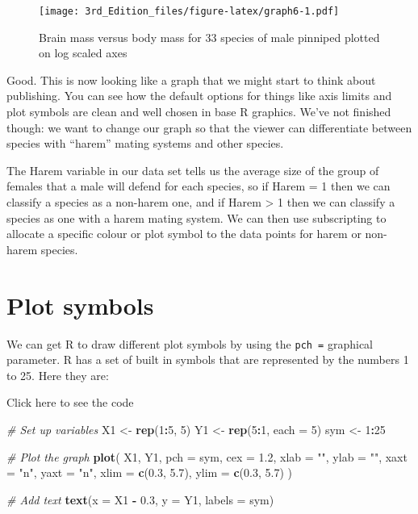 \documentclass[
]{book}
\newenvironment{Shaded}{\begin{snugshade}}{\end{snugshade}}
\newcommand{\CommentTok}[1]{\textcolor[rgb]{0.56,0.35,0.01}{\textit{#1}}}
\newcommand{\DataTypeTok}[1]{\textcolor[rgb]{0.13,0.29,0.53}{#1}}
\newcommand{\DecValTok}[1]{\textcolor[rgb]{0.00,0.00,0.81}{#1}}
\newcommand{\FloatTok}[1]{\textcolor[rgb]{0.00,0.00,0.81}{#1}}
\newcommand{\KeywordTok}[1]{\textcolor[rgb]{0.13,0.29,0.53}{\textbf{#1}}}
\newcommand{\NormalTok}[1]{#1}
\newcommand{\OperatorTok}[1]{\textcolor[rgb]{0.81,0.36,0.00}{\textbf{#1}}}
\newcommand{\StringTok}[1]{\textcolor[rgb]{0.31,0.60,0.02}{#1}}
\begin{document}
\begin{figure}
\centering
\texttt{[image: 3rd\_Edition\_files/figure-latex/graph6-1.pdf]}
\caption{\label{fig:graph6}Brain mass versus body mass for 33 species of male pinniped plotted on log scaled axes}
\end{figure}

Good. This is now looking like a graph that we might start to think about publishing. You can see how the default options for things like axis limits and plot symbols are clean and well chosen in base R graphics. We've not finished though: we want to change our graph so that the viewer can differentiate between species with ``harem'' mating systems and other species.

The Harem variable in our data set tells us the average size of the group of females that a male will defend for each species, so if Harem = 1 then we can classify a species as a non-harem one, and if Harem \textgreater{} 1 then we can classify a species as one with a harem mating system. We can then use subscripting to allocate a specific colour or plot symbol to the data points for harem or non-harem species.

\hypertarget{plot-symbols}{%
\section{Plot symbols}\label{plot-symbols}}

We can get R to draw different plot symbols by using the \texttt{pch\ =} graphical parameter. R has a set of built in symbols that are represented by the numbers 1 to 25. Here they are:

Click here to see the code

\begin{Shaded}
\begin{Highlighting}[]
\CommentTok{# Set up variables}
\NormalTok{X1 <-}\StringTok{ }\KeywordTok{rep}\NormalTok{(}\DecValTok{1}\OperatorTok{:}\DecValTok{5}\NormalTok{, }\DecValTok{5}\NormalTok{)}
\NormalTok{Y1 <-}\StringTok{ }\KeywordTok{rep}\NormalTok{(}\DecValTok{5}\OperatorTok{:}\DecValTok{1}\NormalTok{, }\DataTypeTok{each =} \DecValTok{5}\NormalTok{)}
\NormalTok{sym <-}\StringTok{ }\DecValTok{1}\OperatorTok{:}\DecValTok{25}

\CommentTok{# Plot the graph}
\KeywordTok{plot}\NormalTok{(}
\NormalTok{  X1,}
\NormalTok{  Y1,}
  \DataTypeTok{pch =}\NormalTok{ sym,}
  \DataTypeTok{cex =} \FloatTok{1.2}\NormalTok{,}
  \DataTypeTok{xlab =} \StringTok{""}\NormalTok{,}
  \DataTypeTok{ylab =} \StringTok{""}\NormalTok{,}
  \DataTypeTok{xaxt =} \StringTok{"n"}\NormalTok{,}
  \DataTypeTok{yaxt =} \StringTok{"n"}\NormalTok{,}
  \DataTypeTok{xlim =} \KeywordTok{c}\NormalTok{(}\FloatTok{0.3}\NormalTok{, }\FloatTok{5.7}\NormalTok{),}
  \DataTypeTok{ylim =} \KeywordTok{c}\NormalTok{(}\FloatTok{0.3}\NormalTok{, }\FloatTok{5.7}\NormalTok{)}
\NormalTok{)}

\CommentTok{# Add text}
\KeywordTok{text}\NormalTok{(}\DataTypeTok{x =}\NormalTok{ X1 }\OperatorTok{-}\StringTok{ }\FloatTok{0.3}\NormalTok{, }\DataTypeTok{y =}\NormalTok{ Y1, }\DataTypeTok{labels =}\NormalTok{ sym)}
\end{Highlighting}
\end{Shaded}
\end{document}
